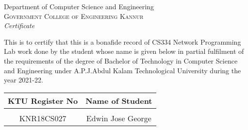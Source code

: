 \newpage
\thispagestyle{empty}
\vspace*{\fill}
\begin{onehalfspace}
\begin{center}

	\huge{Department of Computer Science and Engineering}\\[0.5cm]
	\normalsize \textsc{Government College of Engineering Kannur}\\[2.0cm]

	\emph{\LARGE Certificate}\\[1.0cm]
\end{center}

\normalsize This is to certify that this is a bonafide record of CS334 Network Programming Lab work done by the student whose name is given below in partial fulfilment of the requirements of the degree of Bachelor of Technology in Computer Science and Engineering under A.P.J.Abdul Kalam Technological University during the year 2021-22.\\[1.0cm]

\begin{table}[h]
	\centering
	\begin{tabular}{cc}
		KTU Register No & Name of Student
		\\ \hline \\
		KNR18CS027      & Edwin Jose George
	\end{tabular}
\end{table}


\begin{table}[h]
	\centering
\end{table}
\end{onehalfspace}
\vspace*{\fill}
